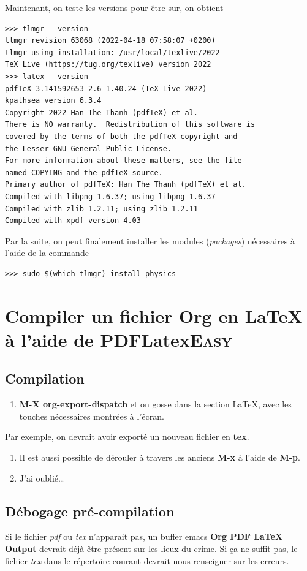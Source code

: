\documentclass[8pt]{article}
\numberwithin{equation}{section}
\begin{document}
Maintenant, on teste les versions pour être sur, on obtient
\begin{verbatim}
>>> tlmgr --version
tlmgr revision 63068 (2022-04-18 07:58:07 +0200)
tlmgr using installation: /usr/local/texlive/2022
TeX Live (https://tug.org/texlive) version 2022
>>> latex --version
pdfTeX 3.141592653-2.6-1.40.24 (TeX Live 2022)
kpathsea version 6.3.4
Copyright 2022 Han The Thanh (pdfTeX) et al.
There is NO warranty.  Redistribution of this software is
covered by the terms of both the pdfTeX copyright and
the Lesser GNU General Public License.
For more information about these matters, see the file
named COPYING and the pdfTeX source.
Primary author of pdfTeX: Han The Thanh (pdfTeX) et al.
Compiled with libpng 1.6.37; using libpng 1.6.37
Compiled with zlib 1.2.11; using zlib 1.2.11
Compiled with xpdf version 4.03
\end{verbatim}
Par la suite, on peut finalement installer les modules (\emph{packages}) nécessaires à l'aide de la commande 
\begin{verbatim}
>>> sudo $(which tlmgr) install physics
\end{verbatim}

\section{Compiler un fichier Org en \LaTeX{} à l'aide de PDFLatex\hfill{}\textsc{Easy}}
\label{sec:orgbfb9097}
\subsection{Compilation}
\label{sec:org35cf9ac}
\begin{enumerate}
\item \textbf{M-X org-export-dispatch} et on gosse dans la section \LaTeX{}, avec les touches nécessaires montrées à l'écran.
\end{enumerate}
Par exemple, on devrait avoir exporté un nouveau fichier en \textbf{tex}.
\begin{enumerate}
\item Il est aussi possible de dérouler à travers les anciens \textbf{M-x} à l'aide de \textbf{M-p}.
\item J'ai oublié\ldots{}
\end{enumerate}

\subsection{Débogage pré-compilation}
\label{sec:org2f94352}
Si le fichier \emph{pdf} ou \emph{tex} n'apparait pas, un buffer emacs \textbf{Org PDF \LaTeX{} Output} devrait déjà être présent sur les lieux du crime. 
Si ça ne suffit pas, le fichier \emph{tex} dans le répertoire courant devrait nous renseigner sur les erreurs.
\end{document}
